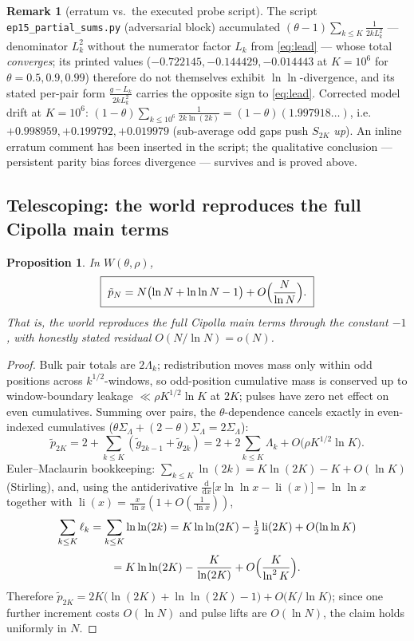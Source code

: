 \documentclass[11pt]{article}
\newtheorem{proposition}[theorem]{Proposition}
\theoremstyle{definition}
\newtheorem{remark}[theorem]{Remark}
\begin{document}
\begin{remark}[erratum vs.\ the executed probe script]
The script \texttt{ep15\_partial\_sums.py} (adversarial block) accumulated $(\theta-1)\sum_{k\le K}\frac{1}{2kL_k^2}$ --- denominator $L_k^2$ without the numerator factor $L_k$ from \eqref{eq:lead} --- whose total \emph{converges}; its printed values ($-0.722145,-0.144429,-0.014443$ at $K=10^6$ for $\theta=0.5,0.9,0.99$) therefore do not themselves exhibit $\ln\ln$-divergence, and its stated per-pair form $\frac{g-L_k}{2kL_k^2}$ carries the opposite sign to \eqref{eq:lead}. Corrected model drift at $K=10^6$: $(1-\theta)\sum_{k\le10^6}\frac{1}{2k\ln(2k)}=(1-\theta)(1.997918\dots)$, i.e.\ $+0.998959,+0.199792,+0.019979$ (sub-average odd gaps push $S_{2K}$ \emph{up}). An inline erratum comment has been inserted in the script; the qualitative conclusion --- persistent parity bias forces divergence --- survives and is proved above.
\end{remark}

\subsection{Telescoping: the world reproduces the full Cipolla main terms}

\begin{proposition}\label{prop:tel}
In $W(\theta,\rho)$,
\[
\boxed{\ \tilde p_N=N\bigl(\ln N+\ln\ln N-1\bigr)+O\Bigl(\frac{N}{\ln N}\Bigr).\ }
\]
That is, the world reproduces the full Cipolla main terms through the constant $-1$, with honestly stated residual $O(N/\ln N)=o(N)$.
\end{proposition}
\begin{proof}
Bulk pair totals are $2\Lambda_k$; redistribution moves mass only within odd positions across $k^{1/2}$-windows, so odd-position cumulative mass is conserved up to window-boundary leakage $\ll\rho K^{1/2}\ln K$ at $2K$; pulses have zero net effect on even cumulatives. Summing over pairs, the $\theta$-dependence cancels exactly in even-indexed cumulatives ($\theta\Sigma_\Lambda+(2-\theta)\Sigma_\Lambda=2\Sigma_\Lambda$):
\[
\tilde p_{2K}=2+\sum_{k\le K}(\tilde g_{2k-1}+\tilde g_{2k})=2+2\sum_{k\le K}\Lambda_k+O\bigl(\rho K^{1/2}\ln K\bigr).
\]
Euler--Maclaurin bookkeeping: $\sum_{k\le K}\ln(2k)=K\ln(2K)-K+O(\ln K)$ (Stirling), and, using the antiderivative $\frac{\mathrm d}{\mathrm dx}\bigl[x\ln\ln x-\operatorname{li}(x)\bigr]=\ln\ln x$ together with $\operatorname{li}(x)=\frac{x}{\ln x}(1+O(\frac1{\ln x}))$,
\[
\begin{gathered}
\sum_{k\le K}\ell_k=\sum_{k\le K}\ln\ln(2k)=K\ln\ln(2K)-\tfrac12\operatorname{li}(2K)+O(\ln\ln K)\\[4pt]
=K\ln\ln(2K)-\frac{K}{\ln(2K)}+O\Bigl(\frac{K}{\ln^2K}\Bigr).
\end{gathered}
\]
Therefore
$\tilde p_{2K}=2K\bigl(\ln(2K)+\ln\ln(2K)-1\bigr)+O\bigl(K/\ln K\bigr)$;
since one further increment costs $O(\ln N)$ and pulse lifts are $O(\ln N)$, the claim holds uniformly in $N$.
\end{proof}
\end{document}
